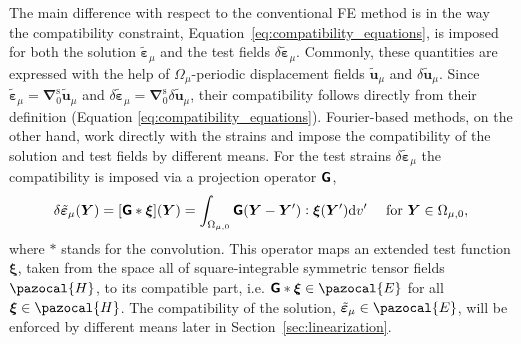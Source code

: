 The main difference with respect to the conventional FE method is in the way the compatibility constraint, Equation~\eqref{eq:compatibility_equations}, is imposed for both the solution \(\tilde{\bm\varepsilon}_\mu\) and the test fields \(\delta \tilde{\bm\varepsilon}_\mu\).
Commonly, these quantities are expressed with the help of \(\Omega_\mu\)-periodic displacement fields \(\tilde{\bm{u}}_\mu\) and \(\delta \tilde{\bm{u}}_\mu\).
Since \(\tilde{\bm\varepsilon}_\mu=\bm{\nabla}_0^{\mathrm{s}} \tilde{\bm u}_\mu\) and \(\delta\tilde{\bm\varepsilon}_\mu=\bm{\nabla}_0^{\mathrm{s}} \delta\tilde{\bm u}_\mu\), their compatibility follows directly from their definition (Equation \eqref{eq:compatibility_equations}).
Fourier-based methods, on the other hand, work directly with the strains and impose the compatibility of the solution and test fields by different means.
For the test strains \(\delta \tilde{\bm \varepsilon}_\mu\) the compatibility is imposed via a projection operator \(\boldsymbol{\mathsf{G}}\),
\begin{equation} \label{eq:compatibility_of_test_functions}
\delta \tilde{\bm\varepsilon}_\mu(\bm{Y})=[\boldsymbol{\mathsf{G}} * \bm{\xi}](\bm{Y})=\int_{\Omega_{\mu,0}} \boldsymbol{\mathsf{G}}(\bm{Y}-\bm{Y}'): \bm{\xi}(\bm{Y}') \mathrm{d} v' \quad\text { for } \bm{Y} \in \Omega_{\mu,0},
\end{equation}
where \(*\) stands for the convolution.
This operator maps an extended test function \(\bm\xi\), taken from the space all of square-integrable symmetric tensor fields \(\pazocal{H}\), to its compatible part, i.e. \(\boldsf G * \bm\xi \in \pazocal{E}\) for all \(\bm\xi \in \pazocal{H}\).
The compatibility of the solution, \(\tilde{\bm\varepsilon}_\mu \in \pazocal{E}\), will be enforced by different means later in Section~\ref{sec:linearization}.

